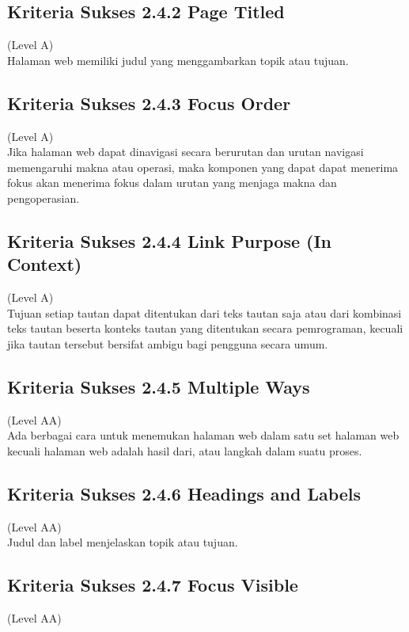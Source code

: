 \subsection{Kriteria Sukses 2.4.2 Page Titled}
\label{subsec:kriteria_2.4.2}
(Level A) \\

Halaman web memiliki judul yang menggambarkan topik atau tujuan.

\subsection{Kriteria Sukses 2.4.3 Focus Order}
\label{subsec:kriteria_2.4.3}
(Level A) \\

Jika halaman web dapat dinavigasi secara berurutan dan urutan navigasi memengaruhi makna atau operasi, maka komponen yang dapat dapat menerima fokus akan menerima fokus dalam urutan yang menjaga makna dan pengoperasian.

\subsection{Kriteria Sukses 2.4.4 Link Purpose (In Context)}
\label{subsec:kriteria_2.4.4}
(Level A) \\

Tujuan setiap tautan dapat ditentukan dari teks tautan saja atau dari kombinasi teks tautan beserta konteks tautan yang ditentukan secara pemrograman, kecuali jika tautan tersebut bersifat ambigu bagi pengguna secara umum.

\subsection{Kriteria Sukses 2.4.5 Multiple Ways}
\label{subsec:kriteria_2.4.5}
(Level AA) \\

Ada berbagai cara untuk menemukan halaman web dalam satu set halaman web kecuali halaman web adalah hasil dari, atau langkah dalam suatu proses.

\subsection{Kriteria Sukses 2.4.6 Headings and Labels}
\label{subsec:kriteria_2.4.6}
(Level AA) \\

Judul dan label menjelaskan topik atau tujuan.

\subsection{Kriteria Sukses 2.4.7 Focus Visible}
\label{subsec:kriteria_2.4.7}
(Level AA) \\

